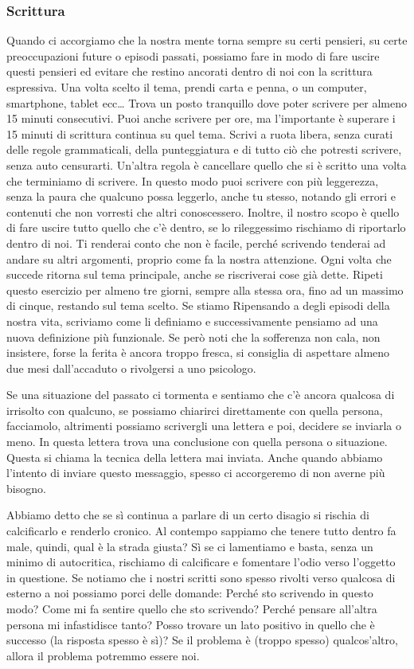 \documentclass[12pt]{book} %
\begin{document}
\subsubsection{Scrittura}
Quando ci accorgiamo che la nostra mente torna sempre su certi pensieri, su certe preoccupazioni future o episodi
passati, possiamo fare in modo di fare uscire questi pensieri ed evitare che restino ancorati dentro di noi con la
scrittura espressiva. Una volta scelto il tema, prendi carta e penna, o un
computer, smartphone, tablet ecc… Trova un posto tranquillo dove poter scrivere per almeno 15 minuti consecutivi.
Puoi anche scrivere per ore, ma l'importante è superare i 15 minuti di scrittura continua su quel
tema. Scrivi a ruota libera, senza curati delle regole grammaticali, della punteggiatura e di tutto ciò che potresti
scrivere, senza auto censurarti. Un'altra regola è cancellare quello che si è
scritto una volta che terminiamo di scrivere. In questo modo puoi scrivere con più leggerezza, senza la paura che
qualcuno possa leggerlo, anche tu stesso, notando gli errori e contenuti che non vorresti che altri conoscessero.
Inoltre, il nostro scopo è quello di fare uscire tutto quello che c'è dentro, se lo rileggessimo
rischiamo di riportarlo dentro di noi. Ti renderai conto che non è facile, perché scrivendo tenderai ad andare su altri
argomenti, proprio come fa la nostra attenzione. Ogni volta che succede ritorna sul tema principale, anche se
riscriverai cose già dette. Ripeti questo esercizio per almeno tre giorni, sempre alla stessa ora, fino ad un massimo
di cinque, restando sul tema scelto. 
Se stiamo Ripensando a degli episodi della nostra vita, scriviamo come li definiamo e successivamente pensiamo ad una nuova definizione più funzionale. Se però noti che la sofferenza non cala, non insistere, forse la
ferita è ancora troppo fresca, si consiglia di aspettare almeno due mesi dall'accaduto o rivolgersi a uno psicologo.

Se una situazione del passato ci tormenta e sentiamo che c'è ancora qualcosa di irrisolto con qualcuno, se possiamo
chiarirci direttamente con quella persona, facciamolo, altrimenti possiamo scrivergli una lettera e poi, decidere se
inviarla o meno. In questa lettera trova una conclusione con quella persona o situazione.
Questa si chiama la tecnica della lettera mai inviata. Anche quando abbiamo l'intento di inviare questo messaggio, spesso ci accorgeremo di non averne più bisogno.

Abbiamo detto che se sì continua a parlare di un certo disagio si rischia di calcificarlo e renderlo cronico. Al contempo sappiamo
che tenere tutto dentro fa male, quindi, qual è la strada giusta? Sì se ci lamentiamo e basta, senza un minimo di
autocritica, rischiamo di calcificare e fomentare l'odio verso l'oggetto in questione. Se notiamo
che i nostri scritti sono spesso rivolti verso qualcosa di esterno a noi possiamo porci delle domande: Perché sto
scrivendo in questo modo? Come mi fa sentire quello che sto scrivendo? Perché pensare all'altra
persona mi infastidisce tanto? Posso trovare un lato positivo in quello che è successo (la risposta spesso è sì)?
Se il problema è (troppo spesso) qualcos'altro, allora il problema potremmo essere noi.
\end{document}
